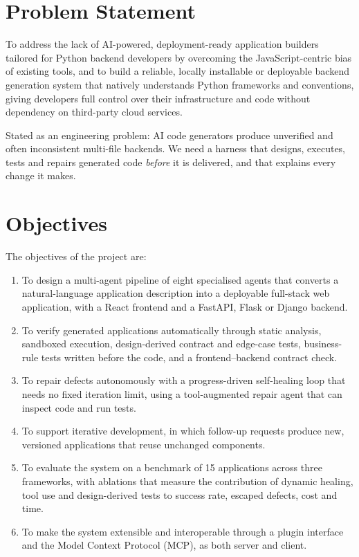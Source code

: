 \documentclass[12pt,a4paper]{report}
\begin{document}
\section{Problem Statement}

To address the lack of AI-powered, deployment-ready application builders tailored for Python backend developers by overcoming the JavaScript-centric bias of existing tools, and to build a reliable, locally installable or deployable backend generation system that natively understands Python frameworks and conventions, giving developers full control over their infrastructure and code without dependency on third-party cloud services.

Stated as an engineering problem: AI code generators produce unverified and often inconsistent multi-file backends. We need a harness that designs, executes, tests and repairs generated code \emph{before} it is delivered, and that explains every change it makes.

\section{Objectives}

The objectives of the project are:

\begin{enumerate}
    \item To design a multi-agent pipeline of eight specialised agents that converts a natural-language application description into a deployable full-stack web application, with a React frontend and a FastAPI, Flask or Django backend.
    \item To verify generated applications automatically through static analysis, sandboxed execution, design-derived contract and edge-case tests, business-rule tests written before the code, and a frontend--backend contract check.
    \item To repair defects autonomously with a progress-driven self-healing loop that needs no fixed iteration limit, using a tool-augmented repair agent that can inspect code and run tests.
    \item To support iterative development, in which follow-up requests produce new, versioned applications that reuse unchanged components.
    \item To evaluate the system on a benchmark of 15 applications across three frameworks, with ablations that measure the contribution of dynamic healing, tool use and design-derived tests to success rate, escaped defects, cost and time.
    \item To make the system extensible and interoperable through a plugin interface and the Model Context Protocol (MCP), as both server and client.
\end{enumerate}
\end{document}
